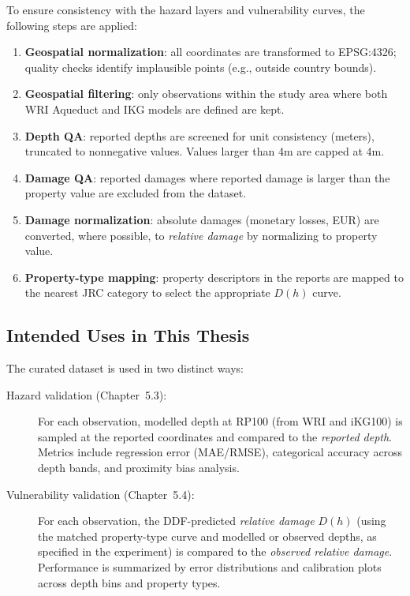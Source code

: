 To ensure consistency with the hazard layers and vulnerability curves, the following steps are applied:
\begin{enumerate}
    \item \textbf{Geospatial normalization}: all coordinates are transformed to EPSG:4326; quality checks identify implausible points (e.g., outside country bounds).
    \item \textbf{Geospatial filtering}: only observations within the study area where both WRI Aqueduct and IKG models are defined are kept.
    \item \textbf{Depth QA}: reported depths are screened for unit consistency (meters), truncated to nonnegative values. Values larger than 4m are capped at 4m.
    \item \textbf{Damage QA}: reported damages where reported damage is larger than the property value are excluded from the dataset.
    \item \textbf{Damage normalization}: absolute damages (monetary losses, EUR) are converted, where possible, to \textit{relative damage} by normalizing to property value.
    \item \textbf{Property-type mapping}: property descriptors in the reports are mapped to the nearest JRC category to select the appropriate \(D(h)\) curve.
\end{enumerate}

\subsection{Intended Uses in This Thesis}

The curated dataset is used in two distinct ways:
\begin{description}
    \item[Hazard validation (Chapter~5.3):] For each observation, modelled depth at RP100 (from WRI and iKG100) is sampled at the reported coordinates and compared to the \emph{reported depth}. Metrics include regression error (MAE/RMSE), categorical accuracy across depth bands, and proximity bias analysis.
    \item[Vulnerability validation (Chapter~5.4):] For each observation, the DDF-predicted \emph{relative damage} \(D(h)\) (using the matched property-type curve and modelled or observed depths, as specified in the experiment) is compared to the \emph{observed relative damage}. Performance is summarized by error distributions and calibration plots across depth bins and property types.
\end{description}

